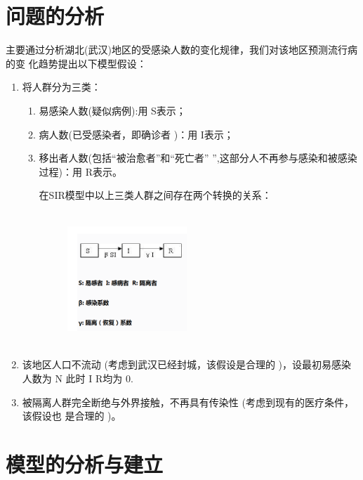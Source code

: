 \documentclass{article}
\begin{document}
\section{问题的分析}
主要通过分析湖北(武汉)地区的受感染人数的变化规律，我们对该地区预测流行病的变
化趋势提出以下模型假设：
\begin{enumerate}
\item
将人群分为三类：
\begin{enumerate}
\item 易感染人数(疑似病例):用 S表示；
\item 病人数(已受感染者，即确诊者 )：用 I表示；
\item 移出者人数(包括“被治愈者”和“死亡者” ”,这部分人不再参与感染和被感染过程)：用 R表示。

在SIR模型中以上三类人群之间存在两个转换的关系：
\newpage
\begin{figure}[h!]
                \centering
                \includegraphics[width=4.5cm,height=5cm]{11.png}
                \end{figure}
\end{enumerate}

\item 该地区人口不流动 (考虑到武汉已经封城，该假设是合理的 )，设最初易感染人数为 N
此时 I R均为 0.
\item 被隔离人群完全断绝与外界接触，不再具有传染性 (考虑到现有的医疗条件，该假设也
是合理的 )。
\end{enumerate}
\section{模型的分析与建立}
\end{document}
